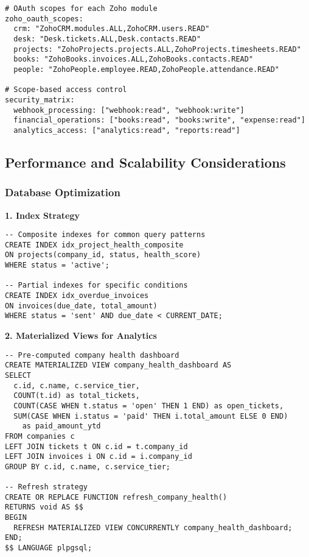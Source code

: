 \begin{verbatim}
# OAuth scopes for each Zoho module
zoho_oauth_scopes:
  crm: "ZohoCRM.modules.ALL,ZohoCRM.users.READ"
  desk: "Desk.tickets.ALL,Desk.contacts.READ"  
  projects: "ZohoProjects.projects.ALL,ZohoProjects.timesheets.READ"
  books: "ZohoBooks.invoices.ALL,ZohoBooks.contacts.READ"
  people: "ZohoPeople.employee.READ,ZohoPeople.attendance.READ"
  
# Scope-based access control
security_matrix:
  webhook_processing: ["webhook:read", "webhook:write"]
  financial_operations: ["books:read", "books:write", "expense:read"]
  analytics_access: ["analytics:read", "reports:read"]
\end{verbatim}

\subsection{Performance and Scalability Considerations}

\subsubsection{Database Optimization}

\textbf{1. Index Strategy}
\begin{verbatim}
-- Composite indexes for common query patterns
CREATE INDEX idx_project_health_composite 
ON projects(company_id, status, health_score) 
WHERE status = 'active';

-- Partial indexes for specific conditions
CREATE INDEX idx_overdue_invoices 
ON invoices(due_date, total_amount) 
WHERE status = 'sent' AND due_date < CURRENT_DATE;
\end{verbatim}

\textbf{2. Materialized Views for Analytics}
\begin{verbatim}
-- Pre-computed company health dashboard
CREATE MATERIALIZED VIEW company_health_dashboard AS
SELECT 
  c.id, c.name, c.service_tier,
  COUNT(t.id) as total_tickets,
  COUNT(CASE WHEN t.status = 'open' THEN 1 END) as open_tickets,
  SUM(CASE WHEN i.status = 'paid' THEN i.total_amount ELSE 0 END) 
    as paid_amount_ytd
FROM companies c
LEFT JOIN tickets t ON c.id = t.company_id
LEFT JOIN invoices i ON c.id = i.company_id
GROUP BY c.id, c.name, c.service_tier;

-- Refresh strategy
CREATE OR REPLACE FUNCTION refresh_company_health()
RETURNS void AS $$
BEGIN
  REFRESH MATERIALIZED VIEW CONCURRENTLY company_health_dashboard;
END;
$$ LANGUAGE plpgsql;
\end{verbatim}

